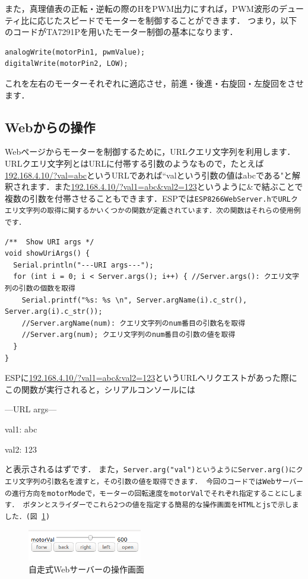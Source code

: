 また，真理値表の正転・逆転の際のHをPWM出力にすれば，PWM波形のデューティ比に応じたスピードでモーターを制御することができます．
つまり，以下のコードがTA7291Pを用いたモーター制御の基本になります．
\begin{verbatim}
analogWrite(motorPin1, pwmValue);
digitalWrite(motorPin2, LOW);
\end{verbatim}
これを左右のモーターそれぞれに適応させ，前進・後進・右旋回・左旋回をさせます．

\subsection{Webからの操作}
Webページからモーターを制御するために，URLクエリ文字列を利用します．URLクエリ文字列とはURLに付帯する引数のようなもので，たとえば\url{192.168.4.10/?val=abc}というURLであれば``valという引数の値はabcである"と解釈されます．また\url{192.168.4.10/?val1=abc&val2=123}というように\&で結ぶことで複数の引数を付帯させることもできます．ESPでは\tt{ESP8266WebServer.h}\rm{}でURLクエリ文字列の取得に関するかいくつかの関数が定義されています．次の関数はそれらの使用例です．
\begin{verbatim}
/**  Show URI args */
void showUriArgs() {
  Serial.println("---URI args---");
  for (int i = 0; i < Server.args(); i++) { //Server.args(): クエリ文字列の引数の個数を取得
    Serial.printf("%s: %s \n", Server.argName(i).c_str(), Server.arg(i).c_str()); 
    //Server.argName(num): クエリ文字列のnum番目の引数名を取得
    //Server.arg(num); クエリ文字列のnum番目の引数の値を取得
  }
}
\end{verbatim}
ESPに\url{192.168.4.10/?val1=abc&val2=123}というURLへリクエストがあった際にこの関数が実行されると，シリアルコンソールには
\tt{

---URL args---

val1: abc

val2: 123

}\rm{}
\noindent
と表示されるはずです．
また，\tt{Server.arg("val")}\rm{}というように\tt{Server.arg()}\rm{}にクエリ文字列の引数名を渡すと，その引数の値を取得できます．
今回のコードではWebサーバーの進行方向をmotorModeで，モーターの回転速度をmotorValでそれぞれ指定することにします．
ボタンとスライダーでこれら2つの値を指定する簡易的な操作画面をHTMLとjsで示しました．(図 \ref{fig:html})

\begin{figure}[htbp]
    \centering
    \includegraphics[width=50mm]{./assets/sample-haibaraasset/motorCtr.png}
    \caption{自走式Webサーバーの操作画面}
    \label{fig:html}
\end{figure}

